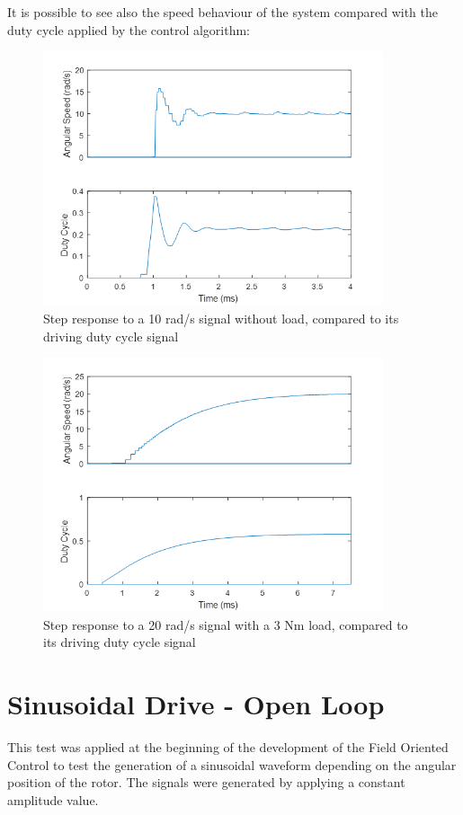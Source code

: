 \clearpage
It is possible to see also the speed behaviour of the system compared with the duty cycle applied by the control algorithm:

\begin{figure}[h!p]
\centering
\includegraphics[width=10cm]{Images/plots/plot_6.png} 
\caption[plot6]{Step response to a 10 rad/s signal without load, compared to its driving duty cycle signal}
\label{fig:plot6}
\end{figure}

\begin{figure}[h!p]
\centering
\includegraphics[width=10cm]{Images/plots/plot_7.png} 
\caption[plot7]{Step response to a 20 rad/s signal with a 3 Nm load, compared to its driving duty cycle signal}
\label{fig:plot7}
\end{figure}

\clearpage
\section{Sinusoidal Drive - Open Loop}

This test was applied at the beginning of the development of the Field Oriented Control to test the generation of a sinusoidal waveform depending on the angular position of the rotor. The signals were generated by applying a constant amplitude value.

